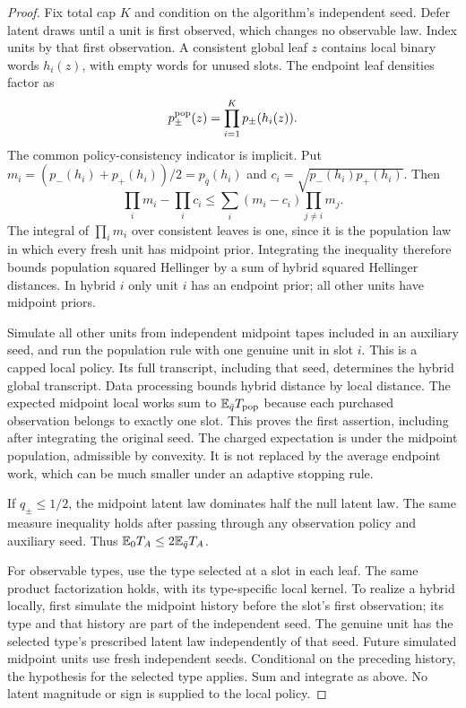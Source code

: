 \begin{proof}
Fix total cap $K$ and condition on the algorithm's independent seed.
Defer latent draws until a unit is first observed, which changes no
observable law. Index units by that first observation. A consistent global leaf $z$
contains local binary words $h_i(z)$, with empty words for unused slots.
The endpoint leaf densities factor as
\[
 p_\pm^{\rm pop}(z)=\prod_{i=1}^K p_\pm(h_i(z)).
\]
The common policy-consistency indicator is implicit. Put
$m_i=(p_-(h_i)+p_+(h_i))/2=p_{\bar q}(h_i)$ and
$c_i=\sqrt{p_-(h_i)p_+(h_i)}$. Then
\[
 \prod_i m_i-\prod_i c_i
 \le\sum_i(m_i-c_i)\prod_{j\ne i}m_j.
\]
The integral of $\prod_i m_i$ over consistent leaves is one, since it
is the population law in which every fresh unit has midpoint prior.
Integrating the inequality therefore bounds population squared Hellinger
by a sum of hybrid squared Hellinger distances. In hybrid $i$ only
unit $i$ has an endpoint prior; all other units have midpoint priors.

Simulate all other units from independent midpoint tapes included in
an auxiliary seed, and run the population rule with one genuine unit
in slot $i$. This is a capped local policy. Its full transcript,
including that seed, determines the hybrid global transcript.
Data processing bounds hybrid distance by local distance. The expected
midpoint local works sum to $\mathbb E_{\bar q}T_{\rm pop}$ because each
purchased observation belongs to exactly one slot. This proves the
first assertion, including after integrating the original seed.
The charged expectation is under the midpoint population, admissible
by convexity. It is not replaced by the average endpoint work, which
can be much smaller under an adaptive stopping rule.

If $q_\pm\le1/2$, the midpoint latent law dominates half the null
latent law. The same measure inequality holds after passing through
any observation policy and auxiliary seed. Thus
$\mathbb E_0T_A\le2\mathbb E_{\bar q}T_A$.

For observable types, use the type selected at a slot in each leaf.
The same product factorization holds, with its type-specific local
kernel. To realize a hybrid locally, first simulate the midpoint
history before the slot's first observation; its type and that history are
part of the independent seed. The genuine unit has the selected type's
prescribed latent law independently of that seed. Future simulated midpoint
units use fresh independent seeds. Conditional on the preceding history, the hypothesis
for the selected type applies. Sum and integrate as above. No latent
magnitude or sign is supplied to the local policy.
\end{proof}

